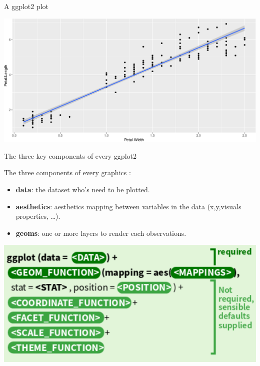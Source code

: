 \documentclass[14pt,ignorenonframetext,]{bredelebeamer}
\newenvironment{Shaded}{\begin{snugshade}}{\end{snugshade}}
\newcommand{\KeywordTok}[1]{\textcolor[rgb]{0.94,0.87,0.69}{#1}}
\newcommand{\DataTypeTok}[1]{\textcolor[rgb]{0.87,0.87,0.75}{#1}}
\newcommand{\StringTok}[1]{\textcolor[rgb]{0.80,0.58,0.58}{#1}}
\newcommand{\OperatorTok}[1]{\textcolor[rgb]{0.94,0.94,0.82}{#1}}
\newcommand{\NormalTok}[1]{\textcolor[rgb]{0.80,0.80,0.80}{#1}}
\providecommand{\tightlist}{%
  \setlength{\itemsep}{0pt}\setlength{\parskip}{0pt}}
\begin{document}
\begin{frame}[fragile]{A ggplot2 plot}

\centering

\begin{Shaded}
\end{Shaded}

\includegraphics{tidyverse_28_03_files/figure-beamer/unnamed-chunk-66-1.pdf}

\end{frame}

\begin{frame}{The three key components of every ggplot2}

\Large

The three components of every graphics :

\begin{itemize}
\tightlist
\item
  \textbf{data}: the dataset who's need to be plotted.
\item
  \textbf{aesthetics}: aesthetics mapping between variables in the data
  (x,y,visuals properties, \ldots{}).
\item
  \textbf{geoms}: one or more layers to render each observations.
\end{itemize}

\begin{center}\includegraphics[width=0.8\linewidth]{images/3ggplot2} \end{center}

\end{frame}
\end{document}
